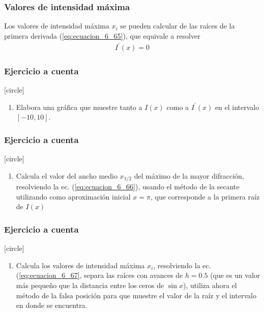\begin{frame}
\frametitle{Valores de intensidad máxima}
Los valores de intensidad máxima $x_{i}$ se pueden calcular de las raíces de la primera derivada (\ref{eq:ecuacion_6_65}), que equivale a resolver
\begin{align}
I^{\prime} (x) = 0
\label{eq:ecuacion_6_67}
\end{align}
\end{frame}
\begin{frame}
\frametitle{Ejercicio a cuenta}
[circle]
\begin{enumerate}[<+->]
\item Elabora una gráfica que muestre tanto a $I(x)$ como a $I^{\prime}(x)$ en el intervalo $[-10, 10]$.
\seti
\end{enumerate}
\end{frame}
\begin{frame}
\frametitle{Ejercicio a cuenta}
[circle]
\begin{enumerate}[<+->]
\conti
\item Calcula el valor del ancho medio $x_{1/2}$ del máximo de la mayor difracción, resolviendo la ec. (\ref{eq:ecuacion_6_66}), usando el método de la secante utilizando como aproximación inicial $x = \pi$, que corresponde a la primera raíz de $I(x)$
\seti
\end{enumerate}
\end{frame}
\begin{frame}
\frametitle{Ejercicio a cuenta}
[circle]
\begin{enumerate}[<+->]
\conti
\item Calcula los valores de intensidad máxima $x_{i}$, resolviendo la ec. (\ref{eq:ecuacion_6_67}, separa las raíces con avances de $h=0.5$ (que es un valor más pequeño que la distancia entre los ceros de $\sin x$), utiliza ahora el método de la falsa posición para que muestre el valor de la raíz y el intervalo en donde se encuentra.
\end{enumerate}
\end{frame}
